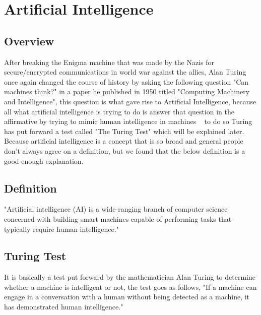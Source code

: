 \section{Artificial Intelligence}
\subsection{Overview} 
        After breaking the Enigma machine that was made by the Nazis for secure/encrypted communications in world war against the allies, Alan Turing once again changed the course of history by asking the following question "Can machines think?" in a paper he published in 1950 titled "Computing Machinery and Intelligence", this question is what gave rise to Artificial Intelligence, because all what artificial intelligence is trying to do is answer that question in the affirmative by trying to mimic human intelligence in machines ~\cite{ai} to do so Turing has put forward a test called "The Turing Test" which will be explained later. Because artificial intelligence is a concept that is  so broad and general people don't always agree on a definition, but we found that the below definition is a good enough explanation.
        
    \subsection{Definition}
        "Artificial intelligence (AI) is a wide-ranging branch of computer science concerned with building smart machines capable of performing tasks that typically require human intelligence." ~\cite{ai}

    \subsection{Turing Test}
        It is basically a test put forward by the mathematician Alan Turing to determine whether a machine is intelligent or not, the test goes as follows, "If a machine can engage in a conversation with a human without being detected as a machine, it has demonstrated human intelligence." ~\cite{turing}
    
